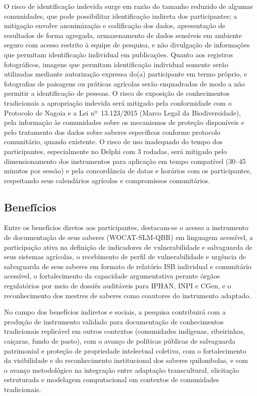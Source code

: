 \documentclass[12pt,a4paper,brazil]{article}
\begin{document}
O risco de identificação indevida surge em razão do tamanho reduzido de algumas comunidades, que pode possibilitar identificação indireta dos participantes; a mitigação envolve anonimização e codificação dos dados, apresentação de resultados de forma agregada, armazenamento de dados sensíveis em ambiente seguro com acesso restrito à equipe de pesquisa, e não divulgação de informações que permitam identificação individual em publicações. Quanto aos registros fotográficos, imagens que permitam identificação individual somente serão utilizadas mediante autorização expressa do(a) participante em termo próprio, e fotografias de paisagens ou práticas agrícolas serão enquadradas de modo a não permitir a identificação de pessoas. O risco de exposição de conhecimentos tradicionais a apropriação indevida será mitigado pela conformidade com o Protocolo de Nagoia e a Lei nº~13.123/2015 (Marco Legal da Biodiversidade), pela informação às comunidades sobre os mecanismos de proteção disponíveis e pelo tratamento dos dados sobre saberes específicos conforme protocolo comunitário, quando existente. O risco de uso inadequado do tempo dos participantes, especialmente no Delphi com 3 rodadas, será mitigado pelo dimensionamento dos instrumentos para aplicação em tempo compatível (30--45 minutos por sessão) e pela concordância de datas e horários com os participantes, respeitando seus calendários agrícolas e compromissos comunitários.

\subsection{Benefícios}

Entre os benefícios diretos aos participantes, destacam-se o acesso a instrumento de documentação de seus saberes (WOCAT-SLM-QBR) em linguagem acessível, a participação ativa na definição de indicadores de vulnerabilidade e salvaguarda de seus sistemas agrícolas, o recebimento de perfil de vulnerabilidade e urgência de salvaguarda de seus saberes em formato de relatório ISB individual e comunitário acessível, o fortalecimento da capacidade argumentativa perante órgãos regulatórios por meio de dossiês auditáveis para IPHAN, INPI e CGen, e o reconhecimento dos mestres de saberes como coautores do instrumento adaptado.

No campo dos benefícios indiretos e sociais, a pesquisa contribuirá com a produção de instrumento validado para documentação de conhecimentos tradicionais replicável em outros contextos (comunidades indígenas, ribeirinhas, caiçaras, fundo de pasto), com o avanço de políticas públicas de salvaguarda patrimonial e proteção de propriedade intelectual coletiva, com o fortalecimento da visibilidade e do reconhecimento institucional dos saberes quilombolas, e com o avanço metodológico na integração entre adaptação transcultural, elicitação estruturada e modelagem computacional em contextos de comunidades tradicionais.
\end{document}
